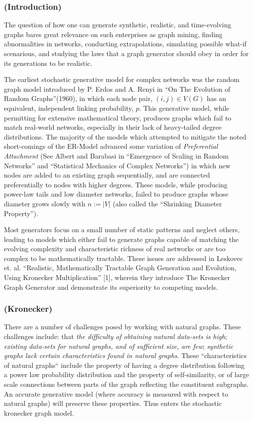 \documentclass{article}
\begin{document}
\subsubsection*{(Introduction)}

The question of how one can generate synthetic, realistic, and time-evolving graphs bares great relevance on such enterprises as graph mining, finding abnormalities in networks, conducting extrapolations, simulating possible what-if scenarious, and studying the laws that a graph generator should obey in order for its generations to be realistic. 

The earliest stochastic generative model for complex networks was the random graph model introduced by P. Erdos and A. Renyi in ``On The Evolution of Random Graphs''(1960), in which each node pair, $(i,j) \in V(G)$ has an equivalent, independent linking probability, $p$. This generative model, while permitting for extensive mathematical theory, produces graphs which fail to match real-world networks, especially in their lack of heavy-tailed degree distributions. The majority of the models which attempted to mitigate the noted short-comings of the ER-Model advanced some variation of \textit{Preferential Attachment} (See Albert and Barabasi in ``Emergence of Scaling in Random Networks'' and ``Statistical Mechanics of Complex Networks'') in which new nodes are added to an existing graph sequentially, and are connected preferentially to nodes with higher degrees. These models, while producing power-law tails and low diameter networks, failed to produce graphs whose diameter grows slowly with $n:=|V|$ (also called the ``Shrinking Diameter Property''). 

Most generators focus on a small number of static patterns and neglect others, leading to models which either fail to generate graphs capable of matching the evolving complexity and characteristic richness of real networks or are too complex to be mathematically tractable. These issues are addressed in Leskovec et. al. ``Realistic, Mathematically Tractable Graph Generation and Evolution, Using Kronecker Multiplication'' [1], wherein they introduce The Kronecker Graph Generator and demonstrate its superiority to competing models.  

\subsubsection*{(Kronecker)}
There are a number of challenges posed by working with natural graphs. These challenges include: that \textit{the difficulty of obtaining natural data-sets is high}; \textit{existing data-sets for natural graphs, and of sufficient size, are few}; \textit{synthetic graphs lack certain characteristics found in natural graphs}. These ``characteristics of natural graphs`` include the property of having a degree distribution following a power law probability distribution and the property of self-similarity, or of large scale connections between parts of the graph reflecting the constituent subgraphs. An accurate generative model (where accuracy is measured with respect to natural graphs) will preserve these properties. Thus enters the stochastic kronecker graph model. 
\end{document}
